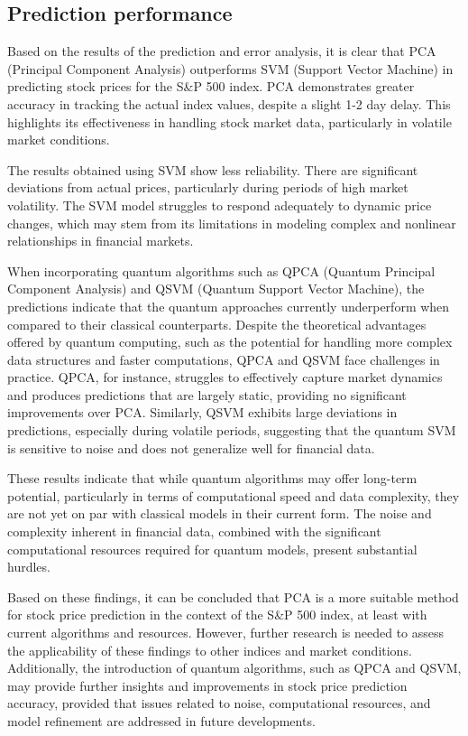\documentclass[journal]{IEEEtran}
\begin{document}
\subsection{Prediction performance}

Based on the results of the prediction and error analysis, it is clear that PCA (Principal Component Analysis) outperforms SVM (Support Vector Machine) in predicting stock prices for the S\&P 500 index. PCA demonstrates greater accuracy in tracking the actual index values, despite a slight 1-2 day delay. This highlights its effectiveness in handling stock market data, particularly in volatile market conditions.

The results obtained using SVM show less reliability. There are significant deviations from actual prices, particularly during periods of high market volatility. The SVM model struggles to respond adequately to dynamic price changes, which may stem from its limitations in modeling complex and nonlinear relationships in financial markets.

When incorporating quantum algorithms such as QPCA (Quantum Principal Component Analysis) and QSVM (Quantum Support Vector Machine), the predictions indicate that the quantum approaches currently underperform when compared to their classical counterparts. Despite the theoretical advantages offered by quantum computing, such as the potential for handling more complex data structures and faster computations, QPCA and QSVM face challenges in practice. QPCA, for instance, struggles to effectively capture market dynamics and produces predictions that are largely static, providing no significant improvements over PCA. Similarly, QSVM exhibits large deviations in predictions, especially during volatile periods, suggesting that the quantum SVM is sensitive to noise and does not generalize well for financial data.

These results indicate that while quantum algorithms may offer long-term potential, particularly in terms of computational speed and data complexity, they are not yet on par with classical models in their current form. The noise and complexity inherent in financial data, combined with the significant computational resources required for quantum models, present substantial hurdles.

Based on these findings, it can be concluded that PCA is a more suitable method for stock price prediction in the context of the S\&P 500 index, at least with current algorithms and resources. However, further research is needed to assess the applicability of these findings to other indices and market conditions. Additionally, the introduction of quantum algorithms, such as QPCA and QSVM, may provide further insights and improvements in stock price prediction accuracy, provided that issues related to noise, computational resources, and model refinement are addressed in future developments.
\end{document}
